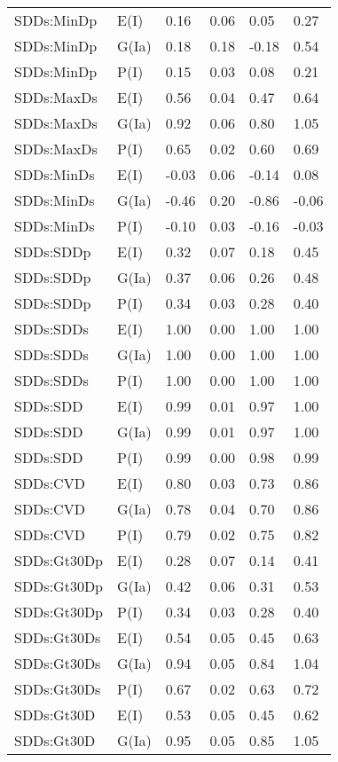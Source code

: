 \begin{center}
\begin{longtable}{|p{1.1in}|p{0.7in}|p{0.7in}|p{0.6in}|p{0.6in}|p{0.6in}|}
  SDDs:MinDp & E(I) & 0.16 & 0.06 & 0.05 & 0.27 \\ 
  SDDs:MinDp & G(Ia) & 0.18 & 0.18 & -0.18 & 0.54 \\ 
  SDDs:MinDp & P(I) & 0.15 & 0.03 & 0.08 & 0.21 \\ 
  SDDs:MaxDs & E(I) & 0.56 & 0.04 & 0.47 & 0.64 \\ 
  SDDs:MaxDs & G(Ia) & 0.92 & 0.06 & 0.80 & 1.05 \\ 
  SDDs:MaxDs & P(I) & 0.65 & 0.02 & 0.60 & 0.69 \\ 
  SDDs:MinDs & E(I) & -0.03 & 0.06 & -0.14 & 0.08 \\ 
  SDDs:MinDs & G(Ia) & -0.46 & 0.20 & -0.86 & -0.06 \\ 
  SDDs:MinDs & P(I) & -0.10 & 0.03 & -0.16 & -0.03 \\ 
  SDDs:SDDp & E(I) & 0.32 & 0.07 & 0.18 & 0.45 \\ 
  SDDs:SDDp & G(Ia) & 0.37 & 0.06 & 0.26 & 0.48 \\ 
  SDDs:SDDp & P(I) & 0.34 & 0.03 & 0.28 & 0.40 \\ 
  SDDs:SDDs & E(I) & 1.00 & 0.00 & 1.00 & 1.00 \\ 
  SDDs:SDDs & G(Ia) & 1.00 & 0.00 & 1.00 & 1.00 \\ 
  SDDs:SDDs & P(I) & 1.00 & 0.00 & 1.00 & 1.00 \\ 
  SDDs:SDD & E(I) & 0.99 & 0.01 & 0.97 & 1.00 \\ 
  SDDs:SDD & G(Ia) & 0.99 & 0.01 & 0.97 & 1.00 \\ 
  SDDs:SDD & P(I) & 0.99 & 0.00 & 0.98 & 0.99 \\ 
  SDDs:CVD & E(I) & 0.80 & 0.03 & 0.73 & 0.86 \\ 
  SDDs:CVD & G(Ia) & 0.78 & 0.04 & 0.70 & 0.86 \\ 
  SDDs:CVD & P(I) & 0.79 & 0.02 & 0.75 & 0.82 \\ 
  SDDs:Gt30Dp & E(I) & 0.28 & 0.07 & 0.14 & 0.41 \\ 
  SDDs:Gt30Dp & G(Ia) & 0.42 & 0.06 & 0.31 & 0.53 \\ 
  SDDs:Gt30Dp & P(I) & 0.34 & 0.03 & 0.28 & 0.40 \\ 
  SDDs:Gt30Ds & E(I) & 0.54 & 0.05 & 0.45 & 0.63 \\ 
  SDDs:Gt30Ds & G(Ia) & 0.94 & 0.05 & 0.84 & 1.04 \\ 
  SDDs:Gt30Ds & P(I) & 0.67 & 0.02 & 0.63 & 0.72 \\ 
  SDDs:Gt30D & E(I) & 0.53 & 0.05 & 0.45 & 0.62 \\ 
  SDDs:Gt30D & G(Ia) & 0.95 & 0.05 & 0.85 & 1.05 \\ 

\end{longtable}
\end{center}
